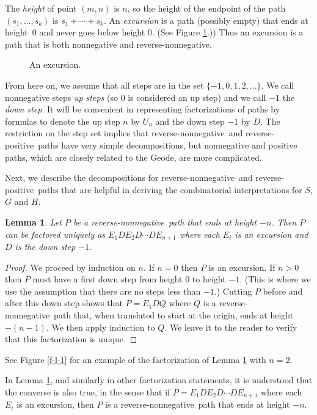 \documentclass[12pt,reqno, oneside]{amsart}
\newtheorem{lem}[thm]{Lemma}
\newcommand{\rn}{reverse-nonnegative}
\newcommand{\rp}{reverse-positive}
\begin{document}
The \emph{height} of point $(m,n)$ is $n$, so the height of the endpoint of the path $(s_1,\dots, s_k)$ is $s_1+\cdots + s_k$.
An \emph{excursion} is a path (possibly empty) that ends at height~0 and never goes below height 0. (See Figure \ref{f-exc}.)) Thus an excursion is a path that is both nonnegative and \rn.
\begin{figure}[h]
\caption{An excursion.}
\label{f-exc}
\end{figure}

From here on, we assume that all steps are in the set $\{-1,0,1,2,\dots\}$. We call nonnegative steps \emph{up steps} (so $0$ is considered an up step) and we call $-1$ the \emph{down step}. It will be convenient in representing factorizations of paths by formulas to denote the up step $n$ by $U_n$ and the down step $-1$ by $D$. The restriction on the step set implies that \rn\ and \rp\ paths have  very simple decompositions, but nonnegative and positive paths, which are closely related to the Geode, are more complicated.


Next, we describe the decompositions for \rn\ and \rp\ paths that are helpful in deriving the combinatorial interpretations for $S$, $G$ and $H$.
\begin{lem} 
\label{l-1}
Let $P$ be a \rn\ path that ends at height $-n$. 
Then $P$ can be factored uniquely as $E_1 D E_2 D \cdots DE_{n+1}$ where each $E_i$ is an excursion and $D$ is the down step $-1$.
\end{lem}

\begin{proof} 
We proceed by induction on $n$. If $n=0$ then $P$ is an excursion. If $n>0$ then $P$ must have a first down step from height 0 to height $-1$. (This is where we use the assumption that there are no steps less than $-1$.) Cutting $P$ before and after this down step shows that $P=E_1 D Q$ where $Q$ is a \rn\ path that, when translated to start at the origin, ends at height $-(n-1)$. We then apply induction to $Q$.
We leave it to the reader to verify that this factorization is unique.
\end{proof}

See Figure \ref{f-l-1} for an example of the factorization of Lemma \ref{l-1} with $n=2$.


In Lemma \ref{l-1}, and similarly in other factorization statements, it is  understood that the converse is also true, in the sense that if $P=E_1 D E_2 D \cdots DE_{n+1}$ where each $E_i$ is an excursion, then $P$ is a \rn\ path that ends at height $-n$.
\end{document}
